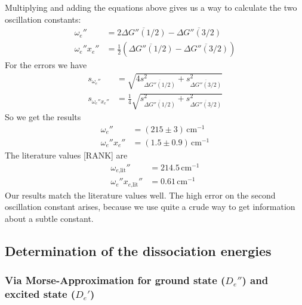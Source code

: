 Multiplying and adding the equations above gives us a way to calculate the two oscillation constants:
\begin{equation}
\begin{split}
  \omega_e'' & =2\overline{\Delta G''(1/2)}- \overline{\Delta G''(3/2)}\\
  \omega_e''x_e'' & =\frac{1}{2}(\overline{\Delta G''(1/2)}- \overline{\Delta G''(3/2)})
  \end{split}
\end{equation}
For the errors we have
\begin{equation}
\begin{split}
  s_{\omega_e''} & =\sqrt{4s^2_{\overline{\Delta G''(1/2)}}+ s^2_{\overline{\Delta G''(3/2)}}}\\
  s_{\omega_e''x_e''} & =\frac{1}{4}\sqrt{s^2_{\overline{\Delta G''(1/2)}}+ s^2_{\overline{\Delta G''(3/2)}}}
\end{split}
\end{equation}
So we get the results
\begin{equation}
\begin{split}
  \omega_e'' & =(215 \pm 3)\,\text{cm}^{-1}\\
  \omega_e''x_e'' & =(1.5 \pm 0.9)\,\text{cm}^{-1}
  \end{split}
\end{equation}
The literature values [RANK] are %
\begin{equation}
\begin{split}
  \omega_{e\text{,lit}}'' & =214.5\,\text{cm}^{-1}\\
  \omega_e''x_{e\text{,lit}}'' & =0.61\,\text{cm}^{-1}
  \end{split}
\end{equation}
Our results match the literature values well. The high error on the second oscillation constant
arises, because we use quite a crude way to get information about a subtle constant.



\subsection{Determination of the dissociation energies}

\subsubsection{Via Morse-Approximation for ground state ($D_e''$) and excited state ($D_e'$)}

